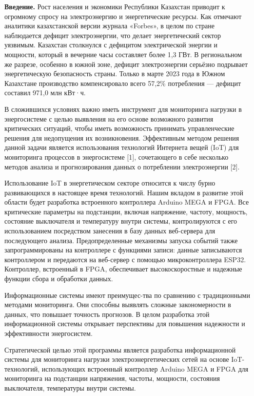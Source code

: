 \begin{multicols}{2}

{\bfseries Введение.} Рост населения и экономики Республики Казахстан
приводит к огромному спросу на электроэнергию и энергетические ресурсы.
Как отмечают аналитики казахстанской версии журнала «Forbes», в целом по
стране наблюдается дефицит электроэнергии, что делает энергетический
сектор уязвимым. Казахстан столкнулся с дефицитом электрической энергии
и мощности, который в вечерние часы составляет более 1,3 ГВт. В
региональном же разрезе, особенно в южной зоне, дефицит электроэнергии
серьёзно подрывает энергетическую безопасность страны. Только в марте
2023 года в Южном Казахстане производство компенсировало всего 57,2\%
потребления --- дефицит составил 971,0 млн кВт·ч.

В сложившихся условиях важно иметь инструмент для мониторинга нагрузки в
энергосистеме с целью выявления на его основе возможного развития
критических ситуаций, чтобы иметь возможность принимать управленческие
решения для недопущения их возникновения. Эффективным методом решения
данной задачи является использования технологий Интернета вещей (IoT)
для мониторинга процессов в энергосистеме {[}1{]}, сочетающего в себе
несколько методов анализа и прогнозирования данных о потреблении
электроэнергии {[}2{]}.

Использование IoT в энергетическом секторе относится к числу бурно
развивающихся в настоящее время технологий. Нашим вкладом в развитие
этой области будет разработка встроенного контроллера Arduino MEGA и
FPGA. Все критические параметры на подстанции, включая напряжение,
частоту, мощность, состояние выключателя и температуру внутри системы,
контролируются с его использованием посредством занесения в базу данных
веб-сервера для последующего анализа. Предопределенные механизмы запуска
событий также запрограммированы на контроллере с функциями записи:
данные записываются контроллером и передаются на веб-сервер с помощью
микроконтроллера ESP32. Контроллер, встроенный в FPGA, обеспечивает
высокоскоростные и надежные функции сбора и обработки данных.

Информационные системы имеют преимущес-тва по сравнению с традиционными
методами мониторинга. Они способны выявлять сложные закономерности в
данных, что повышает точность прогнозов. В целом разработка этой
информационной системы открывает перспективы для повышения надежности и
эффективности энергосистем.

Стратегической целью этой программы является разработка информационной
системы для мониторинга нагрузки электроэнергетических сетей на основе
IoT-технологий, использующих встроенный контроллер Arduino MEGA и FPGA
для мониторинга на подстанции напряжения, частоты, мощности, состояния
выключателя, температуры внутри системы.


\end{multicols}
